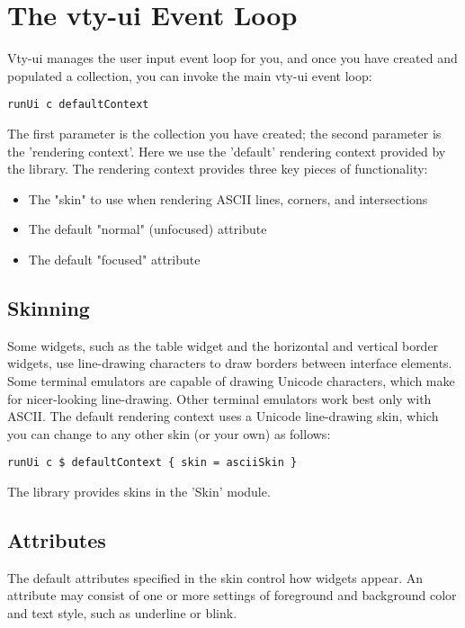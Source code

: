 \section{The vty-ui Event Loop}

Vty-ui manages the user input event loop for you, and once you have
created and populated a collection, you can invoke the main vty-ui event
loop:

\begin{verbatim}
runUi c defaultContext
\end{verbatim}

The first parameter is the collection you have created; the second
parameter is the 'rendering context'.  Here we use the 'default'
rendering context provided by the library.  The rendering context
provides three key pieces of functionality:

\begin{itemize}
\item The "skin" to use when rendering ASCII lines, corners, and
      intersections
\item The default "normal" (unfocused) attribute
\item The default "focused" attribute
\end{itemize}

\subsection{Skinning}

Some widgets, such as the table widget and the horizontal and vertical
border widgets, use line-drawing characters to draw borders between
interface elements.  Some terminal emulators are capable of drawing
Unicode characters, which make for nicer-looking line-drawing.  Other
terminal emulators work best only with ASCII.  The default rendering
context uses a Unicode line-drawing skin, which you can change to any
other skin (or your own) as follows:

\begin{verbatim}
runUi c $ defaultContext { skin = asciiSkin }
\end{verbatim}

The library provides skins in the 'Skin' module.

\subsection{Attributes}

The default attributes specified in the skin control how widgets appear.
An attribute may consist of one or more settings of foreground and
background color and text style, such as underline or blink.

